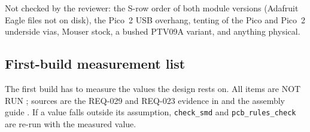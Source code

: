 Not checked by the reviewer: the S-row order of both module versions (Adafruit
Eagle files not on disk), the Pico~2 USB overhang, tenting of the Pico and Pico~2
underside vias, Mouser stock, a bushed PTV09A variant, and anything physical.

\subsection{First-build measurement list}
\label{sec:v13-first-build}

The first build has to measure the values the design rests on. All items are NOT RUN
\lbl{[PHYSICAL]}; sources are the REQ-029 and REQ-023 evidence in
 and the assembly guide
. If a value falls outside its assumption,
\nolinkurl{check_smd} and \nolinkurl{pcb_rules_check} are re-run with the measured
value.

